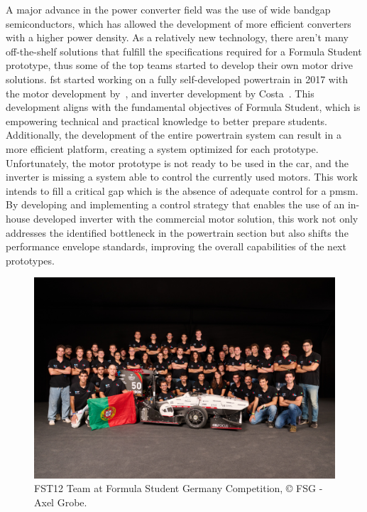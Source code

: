 A major advance in the power converter field was the use of wide bandgap semiconductors, which has allowed the development of more efficient converters with a higher power density. As a relatively new technology, there aren't many off-the-shelf solutions that fulfill the specifications required for a Formula Student prototype, thus some of the top teams started to develop their own motor drive solutions\@. \gls{fst} started working on a fully self-developed powertrain in 2017 with the motor development by~\citet{Sarrico:MSc}, and inverter development by Costa~\cite{Costa:MSc}. This development aligns with the fundamental objectives of Formula Student, which is empowering technical and practical knowledge to better prepare students. Additionally, the development of the entire powertrain system can result in a more efficient platform, creating a system optimized for each prototype. Unfortunately, the motor prototype is not ready to be used in the car, and the inverter is missing a system able to control the currently used motors. This work intends to fill a critical gap which is the absence of adequate control for a \gls{pmsm}. By developing and implementing a control strategy that enables the use of an in-house developed inverter with the commercial motor solution, this work not only addresses the identified bottleneck in the powertrain section but also shifts the performance envelope standards, improving the overall capabilities of the next prototypes.

\begin{figure}[!htb]
	\centering
		\includegraphics[clip, trim=4cm 18cm 4cm 19cm, width=1\textwidth]{Figures/20230817_11-40-48_7254_grobe.jpg}
	\caption[FST12 Team at Formula Student Germany Competition.]{FST12 Team at Formula Student Germany Competition, © FSG - Axel Grobe.}
	\label{fig:fst12_fsg}%
\end{figure}
